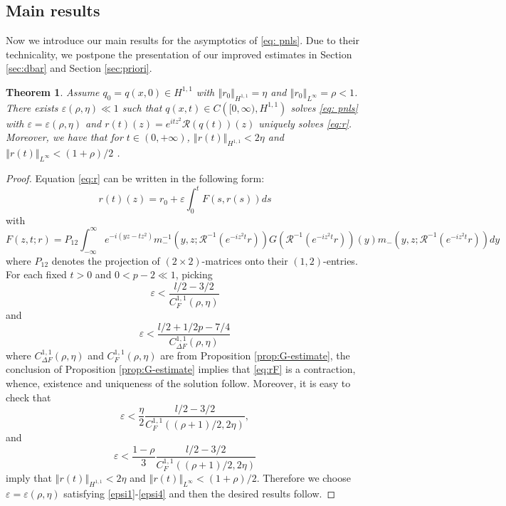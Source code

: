 \documentclass{amsart}
\theoremstyle{plain}
\newtheorem{theorem}{Theorem}[section]
\theoremstyle{remark}
\numberwithin{equation}{section}
\newcommand{\Red}[1]{{\color{red} #1}}
\newcommand{\norm}[2]{\left\Vert #1\right\Vert_{#2}}
\begin{document}
\subsection{Main results}
Now we introduce our main results for the asymptotics of \eqref{eq: pnls}. Due to their technicality, we postpone the presentation of our improved  estimates in Section \ref{sec:dbar} and Section \ref{sec:priori}. 

\begin{theorem}
\label{thm:r}
Assume $q_0=q(x,0)\in H^{1,1} $  with $\norm{r_0}{H^{1,1}}=\eta$ and $\norm{r_0}{L^\infty}=\rho<1$. There exists $\varepsilon(\rho, \eta)\ll 1$ such that $q(x,t) \in C\left([0, \infty), H^{1,1}\right)$ solves \eqref{eq: pnls} with  $
\varepsilon=\varepsilon(\rho, \eta)$ and $r(t)(z)=e^{i t z^2} \mathcal{R}(q(t))(z)$ uniquely solves \eqref{eq:r}. Moreover, we have that for $t\in (0,+\infty)$, $\norm{r(t)}{H^{1,1}}<2\eta$ and $\norm{r(t)}{L^\infty}<(1+\rho)/2$ .
\end{theorem}
\begin{proof}
    Equation \eqref{eq:r} can be written in the following form:
\begin{equation}
    \label{eq:rF}
    r(t)(z)=r_0+\varepsilon \int_0^t F(s, r(s)) d s
\end{equation}
with
\begin{equation}
\label{F}
    F(z,t;r)=P_{12} \int_{-\infty}^{\infty} e^{-i\left(y z-t z^2\right)} m_{-}^{-1}\left(y, z ; \mathcal{R}^{-1}\left(e^{-i z^2 t} r\right)\right) G\left(\mathcal{R}^{-1}\left(e^{-i z^2 t} r\right)\right)(y) m_{-}\left(y, z ; \mathcal{R}^{-1}\left(e^{-i z^2 t} r\right)\right) d y
\end{equation}
where $P_{12}$ denotes the projection of $(2\times2)$-matrices onto their $(1, 2)$-entries. For each fixed $t>0$ and $0<p-2\ll 1$, picking
\begin{equation}
\label{epsi1}
    \varepsilon <\frac{l/2-3/2}{ C_{F}^{1,1}(\rho, \eta)}
\end{equation}
and 
\begin{equation}
\label{epsi2}
    \varepsilon <\frac{l/2+1/2p-7/4}{C_{\Delta F}^{1,1}(\rho, \eta) }
\end{equation}where $C_{\Delta F}^{1,1}(\rho, \eta)$ and $ C_{F}^{1,1}(\rho, \eta)$ are from Proposition \ref{prop:G-estimate}, the conclusion of Proposition \ref{prop:G-estimate}
implies that \eqref{eq:rF} is a contraction, whence,  existence and uniqueness of the solution follow. Moreover, it is easy to check that
\begin{equation}
\label{epsi3}
    \varepsilon <\frac{\eta}{2}\frac{l/2-3/2}{C_{F}^{1,1}((\rho+1)/2, 2\eta)} ,
\end{equation}
and 
\begin{equation}
\label{epsi4}
     \varepsilon <\frac{1-\rho}{3}\frac{l/2-3/2}{ C_{F}^{1,1}((\rho+1)/2, 2\eta)}
\end{equation}
imply that $\norm{r(t)}{H^{1,1}}<2\eta$ and $\norm{r(t)}{L^\infty}<(1+\rho)/2$. Therefore we choose $\varepsilon=\varepsilon(\rho, \eta) $ satisfying \eqref{epsi1}-\eqref{epsi4} and then the desired results follow.
\end{proof}
\end{document}
